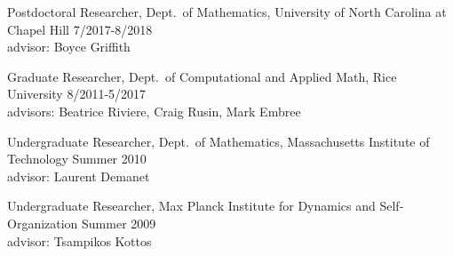 \documentclass{article} %
\begin{document}
\vspace{0.1cm}
\indent
Postdoctoral Researcher, Dept.~of Mathematics, University of North Carolina at Chapel Hill \hspace*{\fill} 7/2017-8/2018 \\
\indent
advisor: Boyce Griffith 

\vspace{0.1cm}
\indent 
Graduate Researcher, Dept.~of Computational and Applied Math, Rice University \hspace*{\fill} 8/2011-5/2017 \\
\indent 
advisors: Beatrice Riviere, Craig Rusin, Mark Embree 

\vspace{0.1cm}
\indent
Undergraduate Researcher, Dept.~of Mathematics, Massachusetts Institute of Technology \hspace*{\fill} Summer 2010 \\
\indent
advisor: Laurent Demanet 

\vspace{0.1cm}
\indent
Undergraduate Researcher, Max Planck Institute for Dynamics and Self-Organization \hspace*{\fill} Summer 2009 \\
\indent
advisor: Tsampikos Kottos 
\end{document}
